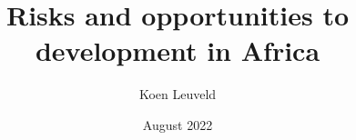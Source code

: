 




\title{Risks and opportunities to development in Africa}
\author{Koen Leuveld}
\date{August 2022}

\maketitle
\tableofcontents
\todototoc
\listoftodos

 





%
%
%

